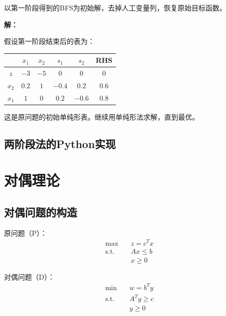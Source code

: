 \begin{example}[第二阶段]
以第一阶段得到的BFS为初始解，去掉人工变量列，恢复原始目标函数。

\textbf{解：}

假设第一阶段结束后的表为：

\begin{table}[H]
\centering
\begin{tabular}{@{}c|cccc|c@{}}
\toprule
& $x_1$ & $x_2$ & $s_1$ & $s_2$ & RHS \\
\midrule
$z$ & $-3$ & $-5$ & $0$ & $0$ & $0$ \\
\midrule
$x_2$ & $0.2$ & $1$ & $-0.4$ & $0.2$ & $0.6$ \\
$x_1$ & $1$ & $0$ & $0.2$ & $-0.6$ & $0.8$ \\
\bottomrule
\end{tabular}
\end{table}

这是原问题的初始单纯形表。继续用单纯形法求解，直到最优。
\end{example}

\subsection{两阶段法的Python实现}\label{sec:twophase-code}

\section{对偶理论}\label{sec:ch2-duality}

\subsection{对偶问题的构造}

\begin{theorem}[对称形式的对偶]
原问题（P）：
\begin{align*}
\max \quad & z = c^T x \\
\text{s.t.} \quad & Ax \leq b \\
& x \geq 0
\end{align*}

对偶问题（D）：
\begin{align*}
\min \quad & w = b^T y \\
\text{s.t.} \quad & A^T y \geq c \\
& y \geq 0
\end{align*}
\end{theorem}

